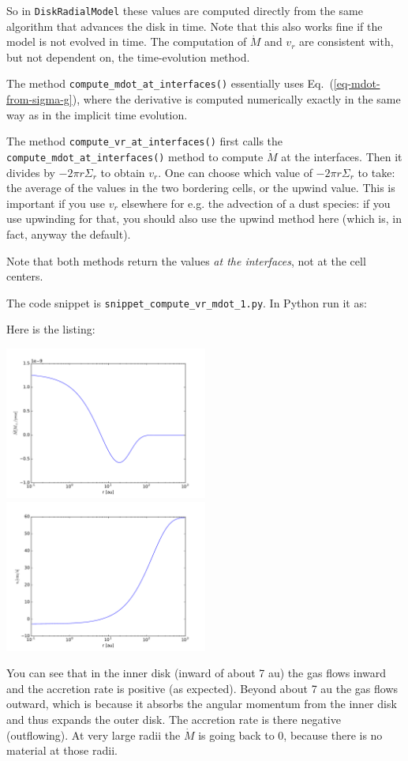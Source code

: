 \documentclass{book}
\newcommand{\code}[1]{{\small\tt #1}}
\begin{document}
So in \code{DiskRadialModel} these values are computed directly from the same
algorithm that advances the disk in time. Note that this also works fine if the
model is not evolved in time. The computation of $\dot M$ and $v_r$ are consistent
with, but not dependent on, the time-evolution method.

The method \code{compute\_mdot\_at\_interfaces()} essentially uses
Eq.~(\ref{eq-mdot-from-sigma-g}), where the derivative is computed numerically
exactly in the same way as in the implicit time evolution.

The method \code{compute\_vr\_at\_interfaces()} first calls the
\code{compute\_mdot\_at\_interfaces()} method to compute $\dot M$ at the
interfaces. Then it divides by $-2\pi r \Sigma_r$ to obtain $v_r$. One can
choose which value of $-2\pi r \Sigma_r$ to take: the average of the values
in the two bordering cells, or the upwind value. This is important if you
use $v_r$ elsewhere for e.g. the advection of a dust species: if you use
upwinding for that, you should also use the upwind method here (which is,
in fact, anyway the default).

Note that both methods return the values {\em at the interfaces}, not at the
cell centers.

The code snippet is
\code{snippet\_compute\_vr\_mdot\_1.py}. In Python run it as:
\begin{codebox}
\end{codebox}
Here is the listing:

\centerline{\includegraphics[width=0.5\textwidth]{../snippets/fig_snippet_compute_vr_mdot_1_1.pdf}
\includegraphics[width=0.5\textwidth]{../snippets/fig_snippet_compute_vr_mdot_1_2.pdf}}
You can see that in the inner disk (inward of about 7 au) the gas flows inward and
the accretion rate is positive (as expected). Beyond about 7 au the gas flows outward,
which is because it absorbs the angular momentum from the inner disk and thus expands
the outer disk. The accretion rate is there negative (outflowing). At very large
radii the $\dot M$ is going back to 0, because there is no material at those
radii.
\end{document}
